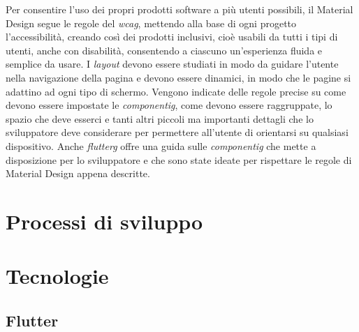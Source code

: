 \newline
Per consentire l'uso dei propri prodotti software a più utenti possibili, il Material Design segue le regole del \emph{\gls{wcag}}\glsfirstoccur, mettendo alla base di ogni progetto l'accessibilità, creando così dei prodotti inclusivi, cioè usabili da tutti i tipi di utenti, anche con disabilità, consentendo a ciascuno un'esperienza fluida e semplice da usare.\newline
\newline
I \emph{layout} devono essere studiati in modo da guidare l'utente nella navigazione della pagina e devono essere dinamici, in modo che le pagine si adattino ad ogni tipo di schermo.\newline
Vengono indicate delle regole precise su come devono essere impostate le \emph{\gls{componentig}}\glsfirstoccur, come devono essere raggruppate, lo spazio che deve esserci e tanti altri piccoli ma importanti dettagli che lo sviluppatore deve considerare per permettere all'utente di orientarsi su qualsiasi dispositivo.\newline
Anche \emph{\gls{flutterg}} offre una guida sulle \emph{\gls{componentig}} che mette a disposizione per lo sviluppatore e che sono state ideate per rispettare le regole di Material Design appena descritte.\newline

\section{Processi di sviluppo}

\section{Tecnologie}

\subsection{Flutter}

